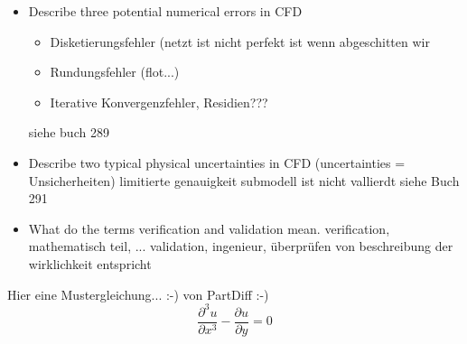 \documentclass[a4paper]{scrartcl}
\begin{document}
\begin{itemize}
\item Describe three potential numerical errors in CFD

\begin{itemize}
\item Disketierungsfehler (netzt ist nicht perfekt ist wenn abgeschitten wir
\item Rundungsfehler (flot...)
\item Iterative Konvergenzfehler, Residien???
\end{itemize}
siehe buch 289

\item Describe two typical physical uncertainties in CFD (uncertainties = Unsicherheiten)
limitierte genauigkeit
submodell ist nicht vallierdt
siehe Buch 291

\item What do the terms verification and validation mean.
verification, mathematisch teil, ...
validation, ingenieur, überprüfen von beschreibung der wirklichkeit entspricht


\end{itemize}



Hier eine Mustergleichung... :-) von PartDiff :-)
\[
\frac{\partial^3 u}{\partial x^3}-\frac{\partial u}{\partial y}=0
\]
\end{document}
